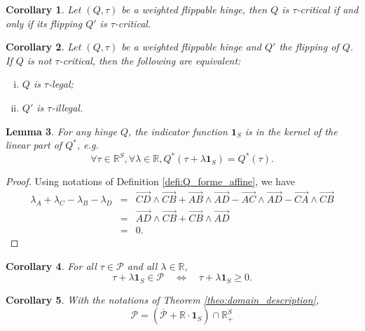 \documentclass[a4paper,12pt]{article}
\def\adm{\P}
\def\RR{\mathbb{R}}
\def\adm{\mathcal{P}}
\def\P{\mathcal{P}}
\newtheorem{lem}{Lemma}[section]		 %
\newtheorem{cor}[lem]{Corollary}
\theoremstyle{definition}
\begin{document}
						\begin{cor}
						 Let $(Q,\tau)$ be a weighted flippable hinge,
						 then $Q$ is $\tau$-critical if and only if its flipping $Q'$ is $\tau$-critical.
						\end{cor}

						\begin{cor} \label{cor:inversion_Qconvexe} Let $(Q,\tau)$ be a weighted flippable hinge and $Q'$ the flipping of $Q$.						
						If $Q$ is not $\tau$-critical, then the following are equivalent:
						\begin{enumerate}[(i)]
						 \item $Q$ is $\tau$-legal;
						 \item $Q'$ is $\tau$-illegal.
						\end{enumerate}
						\end{cor}


						\begin{lem}\label{lem:kernel_hinge} For any hinge $Q$, 
						 the indicator function $\mathbf{1}_S$ is in the kernel of the linear part of $Q^*$, e.g.\ 
						 $$\forall \tau\in \RR^S,\forall \lambda\in \RR, Q^*(\tau+\lambda\mathbf{1}_S)=Q^*(\tau).$$
						\end{lem}
						\begin{proof}
						 Using notations of Definition \ref{defi:Q_forme_affine}, we have
						 \begin{eqnarray*}
						 \lambda_A+\lambda_C-\lambda_B-\lambda_D &=& \overrightarrow{CD}\wedge \overrightarrow{CB} +\overrightarrow{AB}\wedge\overrightarrow{AD} - \overrightarrow{AC}\wedge \overrightarrow{AD}- \overrightarrow{CA}\wedge \overrightarrow{CB} \\
						 &=& \overrightarrow{AD}\wedge \overrightarrow{CB}+ \overrightarrow{CB}\wedge\overrightarrow{AD} \\
						 &=&0.
						 \end{eqnarray*}\end{proof}

						\begin{cor}\label{cor:translation}
							For all $\tau \in \adm$ and all $\lambda \in \RR$, 
							$$\tau+\lambda \mathbf{1}_S\in \adm \quad \Leftrightarrow \quad \tau+\lambda \mathbf{1}_S\geq 0.$$
						\end{cor}
						\begin{cor}\label{cor:theo3_b}
						With the notations of Theorem \ref{theo:domain_description},
							$$\adm = (\overline{\adm} + \RR\cdot\mathbf{1}_S)\cap \RR_+^S$$
						\end{cor}
\end{document}
